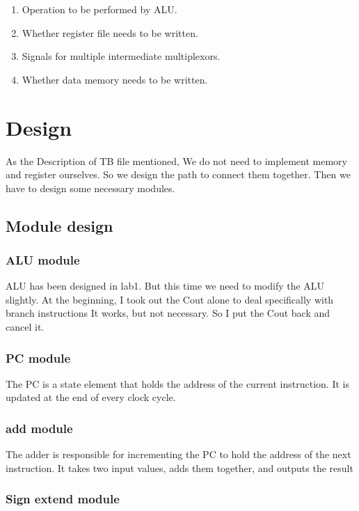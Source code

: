 \documentclass[12pt,a4paper]{article}
\begin{document}
\begin{enumerate}
\item Operation to be performed by ALU.
\item Whether register file needs to be written.
\item Signals for multiple intermediate multiplexors.
\item Whether data memory needs to be written. 
\end{enumerate}

\newpage

\section{Design}

As the Description of TB file mentioned, We do not need to implement memory and register ourselves.
So we design the path to connect them together.
Then we have to design some necessary modules.

\subsection{Module design}

\subsubsection{ALU module}

ALU has been designed in lab1.
But this time we need to modify the ALU slightly.
At the beginning, I took out the Cout alone to deal specifically with branch instructions
It works, but not necessary.
So I put the Cout back and cancel it.


\subsubsection{PC module}

The PC is a state element that holds the address of the current instruction. 
It is updated at the end of every clock cycle.

\subsubsection{add module}

The adder is responsible for incrementing the PC to hold the address of the next instruction.
It takes two input values, adds them together, and outputs the result

\subsubsection{Sign extend module}
\end{document}
